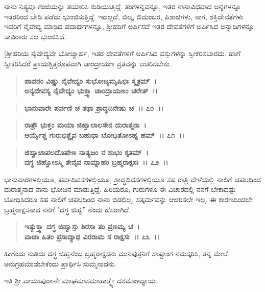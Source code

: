 ನಾನು ನಿತ್ಯವೂ ಗಂಜಿಯನ್ನು ತಯಾರಿಸಿ ಕುಡಿಯುತ್ತಿದ್ದೆ. ತಂಗಳನ್ನವನ್ನೂ, ಇತರ ನಾನಾವಿಧವಾದ ಅನ್ನಗಳನ್ನೂ ಇತರರಿಂದ ಬೇಡಿ ಪಡೆದು ಭುಂಜಿಸುತ್ತಿದ್ದೆ. ಇದಲ್ಲದೆ, ಬಿಲ್ಕ, ಔದುಂಬರ, ಪಿಶಾಚಿಗಳು, ನಾಗ, ಶಕ್ತಿದೇವತೆಗಳು ಇವರಿಗೆ ನೈವೇದ್ಯ ಮಾಡಿದ ಪದಾರ್ಥಗಳನ್ನೂ, ಶ‍್ರೀಹರಿಗೆ ಅರ್ಪಿಸದೆ ಇತರ ದೇವತೆಗಳಿಗೆ ಅರ್ಪಿಸಿದ ಅನ್ನಾದಿಗಳನ್ನೂ ಸಾವಿರಾರು ಸಲ ಭುಂಜಿಸಿದೆ.

[ಶ‍್ರೀಹರಿಯ ನೈವೇದ್ಯವೇ ಭೋಜ್ಯಾರ್ಹ, ಇತರ ದೇವತೆಗಳಿಗೆ ಅರ್ಪಿಸಿದ ವಸ್ತುಗಳನ್ನು ಸ್ವೀಕರಿಸಬಾರದು. ಹಾಗೆ ಸ್ವೀಕರಿಸಿದರೆ ಪ್ರಾಯಶ್ಚಿತ್ತರೂಪವಾಗಿ ಚಾಂದ್ರಾಯಣ ವ್ರತವನ್ನು ಆಚರಿಸಬೇಕು.

\begin{verse}
\textbf{ಪಾವನಂ ವಿಷ್ಣು ನೈವೇದ್ಯಂ ಸುಭೋಜ್ಯಮೃಷಿಭಿಃ ಸ್ಮೃತಮ್~।}\\\textbf{ಅನ್ಯದೇವಸ್ಯ ನೈವೇದ್ಯಂ ಭುಕ್ತ್ವಾ ಚಾಂದ್ರಾಯಣಂ ಚರೇತ್~।।}
\end{verse}

\vauthor{\textbf{(ಶ‍್ರೀ ಕೃಷ್ಣಾಮೃತಮಹಾರ್ಣವ)]}}

\begin{verse}
\textbf{ಭಾನುವಾರೇ ಪರ್ವಣಿ ಚ ತಥಾ ಶ್ರಾದ್ಧದಿನೇಷು ಚ~।। ೭೦~।।} 
\end{verse}

\begin{verse}
\textbf{ರಾತ್ರೌ ಭುಕ್ತಂ ಮಯಾ ಜಿಹ್ವಾಲಾಲಸೇನ ದುರಾತ್ಮನಾ~।}\\\textbf{ಆರ್ಯೈಶ್ಚ ಗುರುಭಿಶ್ಚೈವ ಬಹುಧಾ ಬೋಧಿತೋಽಹ್ಯ ಹಮ್~।। ೭೧~।। }
\end{verse}

\begin{verse}
\textbf{ಜಿಹ್ವಾಚಾಪಲದೊಷೇಣ ನಾತ್ಯಜಂ ನ ಶುಭಂ ಕೃತಮ್~।}\\\textbf{ದಗ್ಧ ಜಿಹ್ವೋಽಸ್ಮಿ ತೇನೈವ ನಾಮ್ನಾಹಂ ಬ್ರಹ್ಮರಾಕ್ಷಸಃ~।। ೭೨~।।}
\end{verse}

ಭಾನುವಾರಗಳಲ್ಲಿಯೂ, ಪರ್ವದಿವಸಗಳಲ್ಲಿಯೂ, ಶ್ರಾದ್ಧದಿವಸಗಳಲ್ಲಿಯೂ ಸಹ ರಾತ್ರಿ ವೇಳೆಯಲ್ಲಿ ನಾಲಿಗೆ ಚಪಲದಿಂದ ದುರಾತ್ಮನಾದ ನಾನು ಭೋಜನ ಮಾಡುತ್ತಿದ್ದೆ. ಹಿರಿಯರೂ, ಗುರುಗಳೂ ಈ ವಿಚಾರದಲ್ಲಿ ನನಗೆ ಬೇಕಾದಷ್ಟು ಬೋಧಿಸಿದರೂ ಸಹ ನಾಲಿಗೆ ಚಪಲದಿಂದ ನಾನು ಬಿಡಲಿಲ್ಲ, ಸತ್ಕರ್ಮವನ್ನು ಆಚರಿಸಲೇ ಇಲ್ಲ. ಈ ಕಾರಣದಿಂದಲೇ ಬ್ರಹ್ಮರಾಕ್ಷಸನಾದ ನನಗೆ "ದಗ್ಧ ಜಿಹ್ವ” ನೆಂದು ಹೆಸರಾಗಿದೆ.

\begin{verse}
\textbf{ಇತ್ಯುಕ್ತ್ವಾ ದಗ್ಧ ಜಿಹ್ವಾಸ್ತು ಶಿರಸಾ ತಂ ಪ್ರಣಮ್ಯ ಚ~।}\\\textbf{ವಾಚಾ ಹಿತಂ ಪ್ರಸಾದ್ಯಾಥ ವಿರರಾಮ ಸ ರಾಕ್ಷಸಃ~।। ೭೩~।।}
\end{verse}

ಹೀಗೆಂದು ನುಡಿದು ದಗ್ಧ ಜಿಹ್ವನೆಂಬ ಬ್ರಹ್ಮರಾಕ್ಷಸನು ಮುನಿಪುತ್ರನಿಗೆ ಸಾಷ್ಟಾಂಗ ನಮಸ್ಕರಿಸಿ, ತನ್ನ ಮೇಲೆ ಅನುಗ್ರಹಮಾಡಬೇಕೆಂದು ಪ್ರಾರ್ಥಿಸಿ ಸುಮ್ಮನಾದನು.

\begin{center}
ಇತಿ ಶ‍್ರೀ.ವಾಯುಪುರಾಣೇ ಮಾಘಮಾಸಮಾಹಾತ್ಮ್ಯೇ ದಶಮೋsಧ್ಯಾಯಃ
\end{center}

